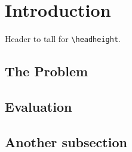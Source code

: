 \documentclass{article}
\begin{document}
\section{Introduction}

Header to tall for \verb|\headheight|.

\subsection{The Problem}
\label{sec:problem}

\lipsum[1]

\subsection{Evaluation}

\lipsum

\subsection{Another subsection}

\lipsum[3]
\end{document}
